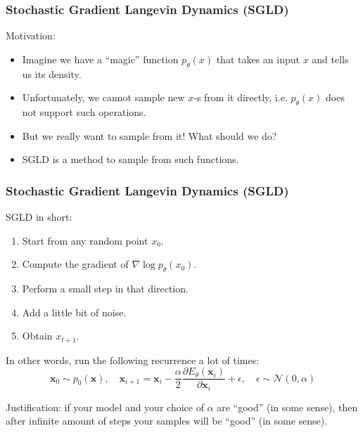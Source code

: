 \documentclass[10pt]{beamer}
\begin{document}
\begin{frame}    
    \frametitle{Stochastic Gradient Langevin Dynamics (SGLD)}
    Motivation:
    \begin{itemize}
        \item\pause Imagine we have a ``magic'' function $p_\theta(x)$ that takes an input $x$ and tells us its density.
        \item\pause Unfortunately, we cannot sample new $x$-s from it directly, i.e. $p_\theta(x)$ does not support such operations.
        \item\pause But we really want to sample from it! What should we do?
        \item\pause SGLD is a method to sample from such functions.
    \end{itemize}
\end{frame}

\begin{frame}
    \frametitle{Stochastic Gradient Langevin Dynamics (SGLD)}
    SGLD in short:
    \begin{enumerate}
        \item\pause Start from any random point $x_0$.
        \item\pause Compute the gradient of $\nabla \log p_\theta(x_0)$.
        \item\pause Perform a small step in that direction.
        \item\pause Add a little bit of noise.
        \item\pause Obtain $x_{t+1}$.
    \end{enumerate}
    \pause In other words, run the following recurrence a lot of times:
\begin{equation}
\mathbf{x}_{0} \sim p_{0}(\mathbf{x}), \quad \mathbf{x}_{i+1}=\mathbf{x}_{i}-\frac{\alpha}{2} \frac{\partial E_{\theta}\left(\mathbf{x}_{i}\right)}{\partial \mathbf{x}_{i}}+\epsilon, \quad \epsilon \sim \mathcal{N}(0, \alpha)
\end{equation}

\pause Justification: if your model and your choice of $\alpha$ are ``good'' (in some sense), then after infinite amount of steps your samples will be ``good'' (in some sense).

\end{frame}
\end{document}
